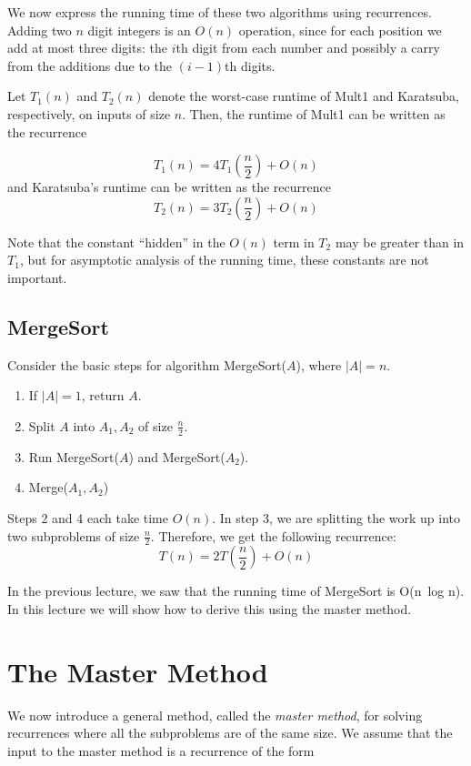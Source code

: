 \documentclass [12pt]{article}
\begin{document}
We now express the running time of these two algorithms using recurrences. Adding two $n$ digit integers is an $O(n)$ operation, since for each position we add at most three digits: the $i$th digit from each number and possibly a carry from the additions due to the $(i-1)$th digits.

Let $T_1(n)$ and $T_2(n)$ denote the worst-case runtime of Mult1 and Karatsuba, respectively, on inputs of size $n$. Then, the runtime of Mult1 can be written as the recurrence

$$
T_1(n) = 4T_1\left(\frac{n}{2}\right) + O(n)
$$
and Karatsuba's runtime can be written as the recurrence
$$
T_2(n) = 3T_2\left(\frac{n}{2} \right) + O(n)
$$

Note that the constant ``hidden'' in the $O(n)$ term in $T_2$ may be greater than in $T_1$, but for asymptotic analysis of the running time, these constants are not important.

\subsection{MergeSort}
Consider the basic steps for algorithm MergeSort($A$), where $|A| = n$.

\begin{enumerate}
    \item If $|A| = 1$, return $A$.
    \item Split $A$ into $A_1, A_2$ of size $\frac{n}{2}$. 
    \item Run MergeSort($A$) and MergeSort($A_2$).
    \item Merge($A_1, A_2$)
\end{enumerate}

Steps 2 and 4 each take time $O(n)$. In step 3, we are splitting the work up into two subproblems of size $\frac{n}{2}$. Therefore, we get the following recurrence:
$$
T(n) = 2T\left(\frac{n}{2} \right) + O(n)
$$

In the previous lecture, we saw that the running time of MergeSort is O(n\ log n). In this lecture we will show how to derive this using the master method.

\section{The Master Method}

We now introduce a general method, called the \textit{master method}, for solving recurrences where all the subproblems are of the same size. We assume that the input to the master method is a recurrence of the form
\end{document}
